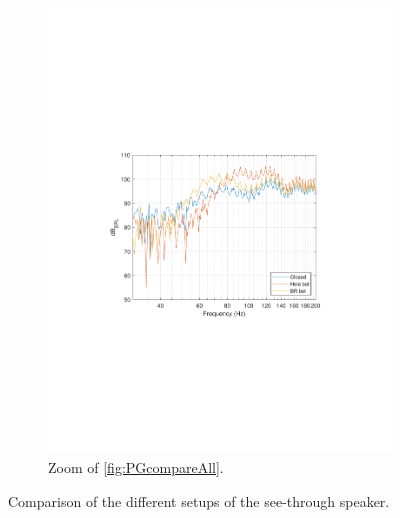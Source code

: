 \begin{figure}
\begin{subfigure}{.5\textwidth}
		\includegraphics[width=.9\linewidth, clip, trim={3.9cm 8.4cm 4.5cm 9cm}]{gfx/SpeakerMeas/PGcompareZoom.pdf}
		\caption{Zoom of \cref{fig:PGcompareAll}.}
		\label{fig:PGcompareZoom}
	\end{subfigure}
	\caption{Comparison of the different setups of the see-through speaker.}
	\label{fig:PGcompare}
\end{figure}